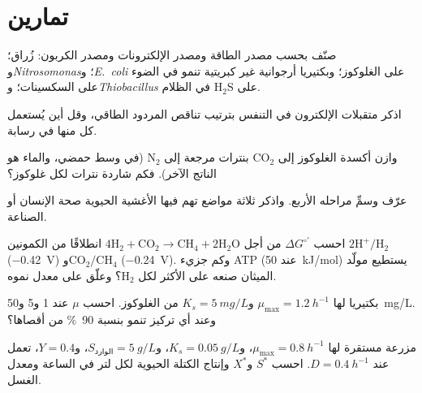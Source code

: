 \section{تمارين}

\begin{exercise}[$\star$]\label{exo:b2:microbial-metabolism:1}
صنّف بحسب مصدر الطاقة ومصدر الإلكترونات ومصدر الكربون: زُراق؛
و\emph{Nitrosomonas}؛ و\emph{E.~coli} على الغلوكوز؛ وبكتيريا
أرجوانية غير كبريتية تنمو في الضوء على السكسينات؛
و\emph{Thiobacillus} على $\mathrm{H_2S}$ في الظلام.
\end{exercise}

\begin{exercise}[$\star$]\label{exo:b2:microbial-metabolism:2}
اذكر متقبلات الإلكترون في التنفس بترتيب تناقص المردود الطاقي، وقل
أين يُستعمل كل منها في رسابة.
\end{exercise}

\begin{exercise}[$\star$]\label{exo:b2:microbial-metabolism:3}
وازن أكسدة الغلوكوز إلى $\mathrm{CO_2}$ بنترات مرجعة إلى
$\mathrm{N_2}$ (في وسط حمضي، والماء هو الناتج الآخر). فكم شاردة
نترات لكل غلوكوز؟
\end{exercise}

\begin{exercise}[$\star$]\label{exo:b2:microbial-metabolism:4}
عرّف  وسمِّ مراحله الأربع. واذكر ثلاثة مواضع تهم فيها
الأغشية الحيوية صحة الإنسان أو الصناعة.
\end{exercise}

\begin{exercise}[$\star\star$]\label{exo:b2:microbial-metabolism:5}
احسب $\Delta G^{\circ\prime}$ من أجل $4\mathrm{H_2} + \mathrm{CO_2}
\to \mathrm{CH_4} + 2\mathrm{H_2O}$ انطلاقًا من الكمونين
$\mathrm{2H^+/H_2}$ (\qty{-0.42}{V}) و$\mathrm{CO_2/CH_4}$
(\qty{-0.24}{V}). وكم جزيء ATP (عند \qty{50}{kJ/mol}) يستطيع مولّد
الميثان صنعه على الأكثر لكل $\mathrm{H_2}$؟ وعلّق على معدل نموه.
\end{exercise}

\begin{exercise}[$\star\star$]\label{exo:b2:microbial-metabolism:6}
بكتيريا لها $\mu_{\max} = \qty{1.2}{h^{-1}}$ و$K_s =
\qty{5}{mg/L}$ من الغلوكوز. احسب $\mu$  عند 1 و5
و\qty{50}{mg/L}. وعند أي تركيز تنمو بنسبة \qty{90}{\%} من أقصاها؟
\end{exercise}

\begin{exercise}[$\star\star$]\label{exo:b2:microbial-metabolism:7}
مزرعة مستقرة لها $\mu_{\max} = \qty{0.8}{h^{-1}}$، و$K_s =
\qty{0.05}{g/L}$، و$S_{\text{الوارد}} = \qty{5}{g/L}$، و$Y = 0.4$، تعمل عند
$D = \qty{0.4}{h^{-1}}$. احسب $S^*$ و$X^*$ وإنتاج الكتلة الحيوية
لكل لتر في الساعة ومعدل الغسل.
\end{exercise}

